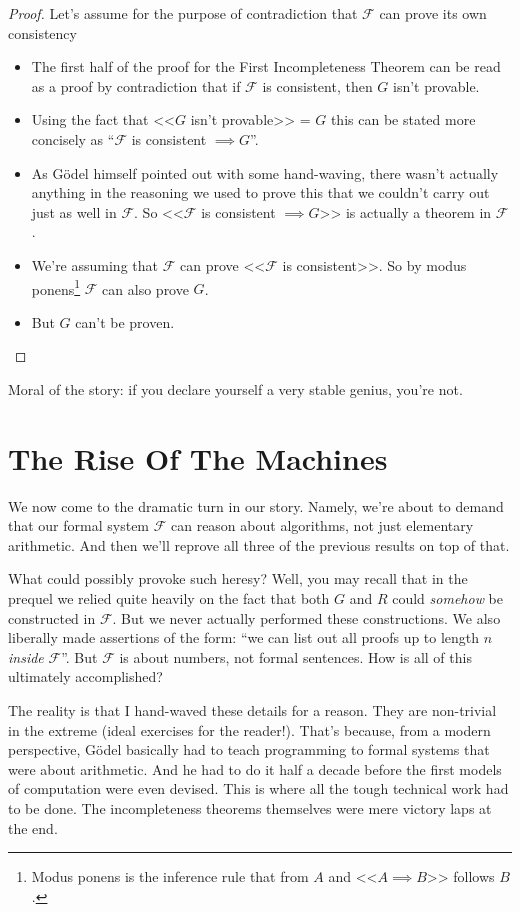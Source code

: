 \documentclass{article}
\theoremstyle{customstyle}
\newcommand{\F}{\ensuremath{\mathcal{F}}}
\begin{document}
\begin{proof}
Let's assume for the purpose of contradiction that $\F$ can prove its own consistency
\begin{itemize}[topsep=0.5em]
\item The first half of the proof for the First Incompleteness Theorem can be read as a proof by contradiction that if $\F$ is consistent, then $G$ isn't provable.
\item Using the fact that <<$G$ isn't provable>> = $G$ this can be stated more concisely as ``$\F$ is consistent $\implies G$''.
\item As Gödel himself pointed out with some hand-waving, there wasn't actually anything in the reasoning we used to prove this that we couldn't carry out just as well in $\F$. So <<$\F$ is consistent $\implies G$>> is actually a theorem in $\F$.
\item We're assuming that $\F$ can prove <<$\F$ is consistent>>. So by modus ponens\footnote{Modus ponens is the inference rule that from $A$ and <<$A \implies B$>> follows $B$.} $\F$ can also prove $G$.
\item But $G$ can't be proven. \lightning\qedhere
\end{itemize}
\end{proof}

Moral of the story: if you declare yourself a very stable genius, you're not.\cite{trump}

\section{The Rise Of The Machines}

We now come to the dramatic turn in our story. Namely, we're about to demand that our formal system $\F$ can reason about algorithms, not just elementary arithmetic. And then we'll reprove all three of the previous results on top of that.

What could possibly provoke such heresy? Well, you may recall that in the prequel we relied quite heavily on the fact that both $G$ and $R$ could \textit{somehow} be constructed in $\F$. But we never actually performed these constructions. We also liberally made assertions of the form: ``we can list out all proofs up to length $n$ \textit{inside} $\F$''. But $\F$ is about numbers, not formal sentences. How is all of this ultimately accomplished?

The reality is that I hand-waved these details for a reason. They are non-trivial in the extreme (ideal exercises for the reader!). That's because, from a modern perspective, Gödel basically had to teach programming to formal systems that were about arithmetic. And he had to do it half a decade before the first models of computation were even devised. This is where all the tough technical work had to be done. The incompleteness theorems themselves were mere victory laps at the end.
\end{document}
